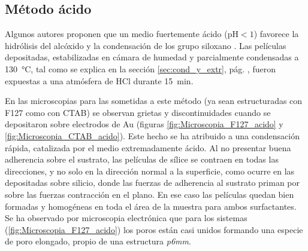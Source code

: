 
	 \subsection{Método ácido}

	 	 Algunos autores proponen que un medio fuertemente ácido (pH$<1$) favorece la hidrólisis del alcóxido y la condensación de los grupo siloxano \cite{Soler-Illia2011,Doshi2000a,Huo1996,Boissiere2000,Beck1992}. Las películas depositadas, estabilizadas en cámara de humedad y  parcialmente condensadas a \SI{130}{\celsius}, tal como se explica en la sección \ref{sec:cond_y_extr}, pág. \pageref{sec:cond_y_extr}, fueron expuestas a una atmósfera de HCl durante \SI{15}{\minute}. 

		 En las microscopias para las \pdm\space sometidas a este método (ya sean estructuradas con F127 como con CTAB) se observan grietas y discontinuidades cuando se depositaron sobre electrodos de Au (figuras \ref{fig:Microscopia_F127_acido} y \ref{fig:Microscopia_CTAB_acido}). Este hecho se ha atribuido a una condensación rápida, catalizada por el medio extremadamente ácido. Al no presentar buena adherencia sobre el sustrato, las películas de sílice se contraen en todas las direcciones, y no solo en la dirección normal a la superficie, como ocurre en las \pdm\space depositadas sobre silicio, donde las fuerzas de adherencia al sustrato priman por sobre las fuerzas contracción en el plano\cite{Sakatani2006,Boissiere2005,Guillemin2010}. En ese caso las películas quedan bien formadas y homogéneas en toda el área de la muestra para ambos surfactantes. Se ha observado por microscopia electrónica que para los sistemas \pdmF\space (\ref{fig:Microscopia_F127_acido}) los  poros están casi unidos formando una especie de poro elongado, propio de una estructura \textit{p6mm}\cite{GonzalezSolveyra2017}. 
	
